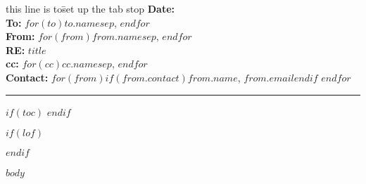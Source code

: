 \documentclass[11pt]{article}
\begin{document}
\makeatletter
\let\insertdate\@date
\makeatother


\vspace{0.1cm}
\begin{flushleft}
\begin{tabbing}
this line is to\= set up the tab stop \kill
{\bf Date:} \> \insertdate \\
{\bf To:} \>  $for(to)$$to.name$$sep$, $endfor$\\
{\bf From:} \> $for(from)$$from.name$$sep$, $endfor$\\
{\bf RE:} \> $title$ \\
{\bf cc:} \> $for(cc)$$cc.name$$sep$, $endfor$ \\
{\bf Contact:} \> $for(from)$$if(from.contact)$$from.name$, $from.email$$endif$ $endfor$\\
\end{tabbing}
\end{flushleft}

\hrule

\vspace{2cm}

$if(toc)$
\tableofcontents
$endif$

\makeatletter
\patchcmd{\@fancyhead}{\rlap}{\color{gray}\rlap}{}{}
\patchcmd{\headrule}{\hrule}{\color{gray}\hrule}{}{}
\patchcmd{\@fancyfoot}{\rlap}{\color{gray}\rlap}{}{}
\patchcmd{\footrule}{\hrule}{\color{gray}\hrule}{}{}
\makeatother



\begin{abstract}
$summary$
\end{abstract}

\newpage
{}
\fancyhead[C]{}
$if(lof)$
\listoffigures
\listoftables
$endif$

\printglossaries

$body$
\label{LastPageOfBackMatter}~
\end{document}
